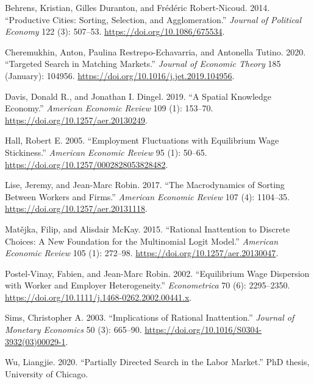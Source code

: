 \documentclass[
  letterpaper,
  DIV=11,
  numbers=noendperiod]{scrreprt}
\newlength{\cslhangindent}
\newlength{\cslentryspacingunit} %
\newenvironment{CSLReferences}[2] %
 {%
  \setlength{\parindent}{0pt}
  \ifodd #1
  \let\oldpar\par
  \def\par{\hangindent=\cslhangindent\oldpar}
  \fi
  \setlength{\parskip}{#2\cslentryspacingunit}
 }%
 {}
\begin{document}
\hypertarget{refs}{}
\begin{CSLReferences}{1}{0}
\leavevmode{}%
Behrens, Kristian, Gilles Duranton, and Frédéric Robert-Nicoud. 2014.
{``Productive {Cities}: {Sorting}, {Selection}, and {Agglomeration}.''}
\emph{Journal of Political Economy} 122 (3): 507--53.
\url{https://doi.org/10.1086/675534}.

\leavevmode{}%
Cheremukhin, Anton, Paulina Restrepo-Echavarria, and Antonella Tutino.
2020. {``Targeted Search in Matching Markets.''} \emph{Journal of
Economic Theory} 185 (January): 104956.
\url{https://doi.org/10.1016/j.jet.2019.104956}.

\leavevmode{}%
Davis, Donald R., and Jonathan I. Dingel. 2019. {``A {Spatial Knowledge
Economy}.''} \emph{American Economic Review} 109 (1): 153--70.
\url{https://doi.org/10.1257/aer.20130249}.

\leavevmode{}%
Hall, Robert E. 2005. {``Employment {Fluctuations} with {Equilibrium
Wage Stickiness}.''} \emph{American Economic Review} 95 (1): 50--65.
\url{https://doi.org/10.1257/0002828053828482}.

\leavevmode{}%
Lise, Jeremy, and Jean-Marc Robin. 2017. {``The {Macrodynamics} of
{Sorting} Between {Workers} and {Firms}.''} \emph{American Economic
Review} 107 (4): 1104--35. \url{https://doi.org/10.1257/aer.20131118}.

\leavevmode{}%
Matějka, Filip, and Alisdair McKay. 2015. {``Rational {Inattention} to
{Discrete Choices}: {A New Foundation} for the {Multinomial Logit
Model}.''} \emph{American Economic Review} 105 (1): 272--98.
\url{https://doi.org/10.1257/aer.20130047}.

\leavevmode{}%
Postel-Vinay, Fabien, and Jean-Marc Robin. 2002. {``Equilibrium {Wage
Dispersion} with {Worker} and {Employer Heterogeneity}.''}
\emph{Econometrica} 70 (6): 2295--2350.
\url{https://doi.org/10.1111/j.1468-0262.2002.00441.x}.

\leavevmode{}%
Sims, Christopher A. 2003. {``Implications of Rational Inattention.''}
\emph{Journal of Monetary Economics} 50 (3): 665--90.
\url{https://doi.org/10.1016/S0304-3932(03)00029-1}.

\leavevmode{}%
Wu, Liangjie. 2020. {``Partially {Directed Search} in the {Labor
Market}.''} PhD thesis, University of Chicago.

\end{CSLReferences}
\end{document}
